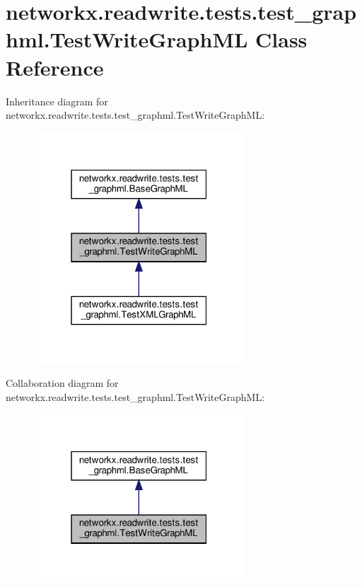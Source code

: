 \hypertarget{classnetworkx_1_1readwrite_1_1tests_1_1test__graphml_1_1TestWriteGraphML}{}\section{networkx.\+readwrite.\+tests.\+test\+\_\+graphml.\+Test\+Write\+Graph\+ML Class Reference}
\label{classnetworkx_1_1readwrite_1_1tests_1_1test__graphml_1_1TestWriteGraphML}


Inheritance diagram for networkx.\+readwrite.\+tests.\+test\+\_\+graphml.\+Test\+Write\+Graph\+ML\+:
\nopagebreak
\begin{figure}[H]
\begin{center}
\leavevmode
\includegraphics[width=223pt]{classnetworkx_1_1readwrite_1_1tests_1_1test__graphml_1_1TestWriteGraphML__inherit__graph}
\end{center}
\end{figure}


Collaboration diagram for networkx.\+readwrite.\+tests.\+test\+\_\+graphml.\+Test\+Write\+Graph\+ML\+:
\nopagebreak
\begin{figure}[H]
\begin{center}
\leavevmode
\includegraphics[width=223pt]{classnetworkx_1_1readwrite_1_1tests_1_1test__graphml_1_1TestWriteGraphML__coll__graph}
\end{center}
\end{figure}
